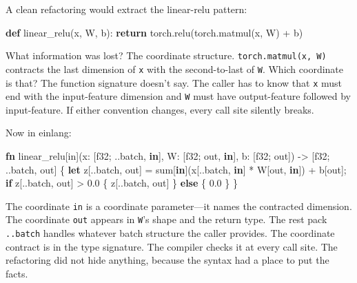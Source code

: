 \documentclass[11pt,]{article}
\newenvironment{Shaded}{}{}
\newcommand{\ControlFlowTok}[1]{\textcolor[rgb]{0.00,0.44,0.13}{\textbf{#1}}}
\newcommand{\DataTypeTok}[1]{\textcolor[rgb]{0.56,0.13,0.00}{#1}}
\newcommand{\DecValTok}[1]{\textcolor[rgb]{0.25,0.63,0.44}{#1}}
\newcommand{\KeywordTok}[1]{\textcolor[rgb]{0.00,0.44,0.13}{\textbf{#1}}}
\newcommand{\NormalTok}[1]{#1}
\newcommand{\OperatorTok}[1]{\textcolor[rgb]{0.40,0.40,0.40}{#1}}
\begin{document}
A clean refactoring would extract the linear-relu pattern:

\begin{Shaded}
\begin{Highlighting}[]
\KeywordTok{def}\NormalTok{ linear_relu(x, W, b):}
    \ControlFlowTok{return}\NormalTok{ torch.relu(torch.matmul(x, W) }\OperatorTok{+}\NormalTok{ b)}
\end{Highlighting}
\end{Shaded}

What information was lost? The coordinate structure.
\texttt{torch.matmul(x,\ W)} contracts the last dimension of \texttt{x}
with the second-to-last of \texttt{W}. Which coordinate is that? The
function signature doesn't say. The caller has to know that \texttt{x}
must end with the input-feature dimension and \texttt{W} must have
output-feature followed by input-feature. If either convention changes,
every call site silently breaks.

Now in einlang:

\begin{Shaded}
\begin{Highlighting}[]
\KeywordTok{fn}\NormalTok{ linear_relu[in](x: }\OperatorTok{[}\DataTypeTok{f32}\NormalTok{; ..batch, }\KeywordTok{in}\OperatorTok{]}\NormalTok{, W: }\OperatorTok{[}\DataTypeTok{f32}\NormalTok{; out, }\KeywordTok{in}\OperatorTok{]}\NormalTok{, b: }\OperatorTok{[}\DataTypeTok{f32}\NormalTok{; out}\OperatorTok{]}\NormalTok{)}
\NormalTok{    -> }\OperatorTok{[}\DataTypeTok{f32}\NormalTok{; ..batch, out}\OperatorTok{]}
\OperatorTok{\{}
    \KeywordTok{let}\NormalTok{ z}\OperatorTok{[}\NormalTok{..batch, out}\OperatorTok{]}\NormalTok{ = sum}\OperatorTok{[}\KeywordTok{in}\OperatorTok{]}\NormalTok{(x}\OperatorTok{[}\NormalTok{..batch, }\KeywordTok{in}\OperatorTok{]}\NormalTok{ * W}\OperatorTok{[}\NormalTok{out, }\KeywordTok{in}\OperatorTok{]}\NormalTok{) + b}\OperatorTok{[}\NormalTok{out}\OperatorTok{]}\NormalTok{;}
    \KeywordTok{if}\NormalTok{ z}\OperatorTok{[}\NormalTok{..batch, out}\OperatorTok{]}\NormalTok{ > }\DecValTok{0.0} \OperatorTok{\{}\NormalTok{ z}\OperatorTok{[}\NormalTok{..batch, out}\OperatorTok{]} \OperatorTok{\}} \KeywordTok{else} \OperatorTok{\{} \DecValTok{0.0} \OperatorTok{\}}
\OperatorTok{\}}
\end{Highlighting}
\end{Shaded}

The coordinate \texttt{in} is a coordinate parameter---it names the
contracted dimension. The coordinate \texttt{out} appears in
\texttt{W}'s shape and the return type. The rest pack \texttt{..batch}
handles whatever batch structure the caller provides. The coordinate
contract is in the type signature. The compiler checks it at every call
site. The refactoring did not hide anything, because the syntax had a
place to put the facts.
\end{document}
